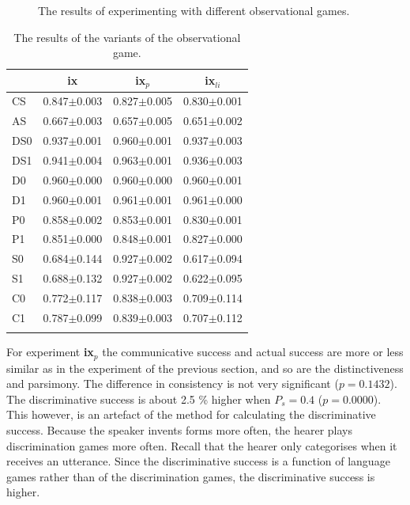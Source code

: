 \begin{figure}[t]
\centering
{}
\caption{The results of experimenting with different observational games.}
\label{f:par:observ}
\end{figure}


\begin{table}
\centering
\begin{tabular}{lccc}
\lsptoprule
&    {\bf ix}&        {\bf ix$_p$}& {\bf ix$_{li}$}\\\midrule
CS&  0.847$\pm$0.003& 0.827$\pm$0.005& 0.830$\pm$0.001\\%
AS&  0.667$\pm$0.003& 0.657$\pm$0.005&0.651$\pm$0.002\\%
DS0& 0.937$\pm$0.001& 0.960$\pm$0.001&0.937$\pm$0.003\\%
DS1& 0.941$\pm$0.004& 0.963$\pm$0.001&0.936$\pm$0.003\\%
D0&  0.960$\pm$0.000& 0.960$\pm$0.000&0.960$\pm$0.001\\%
D1&  0.960$\pm$0.001& 0.961$\pm$0.001&0.961$\pm$0.000\\%
P0&  0.858$\pm$0.002& 0.853$\pm$0.001&0.830$\pm$0.001\\%
P1&  0.851$\pm$0.000& 0.848$\pm$0.001&0.827$\pm$0.000\\%
S0&  0.684$\pm$0.144& 0.927$\pm$0.002&0.617$\pm$0.094\\%
S1&  0.688$\pm$0.132& 0.927$\pm$0.002&0.622$\pm$0.095\\%
C0&  0.772$\pm$0.117& 0.838$\pm$0.003&0.709$\pm$0.114\\%
C1&  0.787$\pm$0.099& 0.839$\pm$0.003&0.707$\pm$0.112\\%
\lspbottomrule
\end{tabular}
\caption{The results of the variants of the observational game.}
\label{t:par:observ}
\end{table}

For experiment {\bf ix$_p$} the communicative success and actual success are more or less similar as in the experiment of the previous section, and so are the distinctiveness and parsimony. The difference in consistency is not very significant ($p=0.1432$). The discriminative success is about 2.5 \% higher when $P_s=0.4$ ($p=0.0000$). This however, is an artefact of the method for calculating the discriminative success. Because the speaker invents forms more often, the hearer plays discrimination games more often. Recall that the hearer only categorises when it receives an utterance. Since the discriminative success is a function of language games rather than of the discrimination games, the discriminative success is higher.


